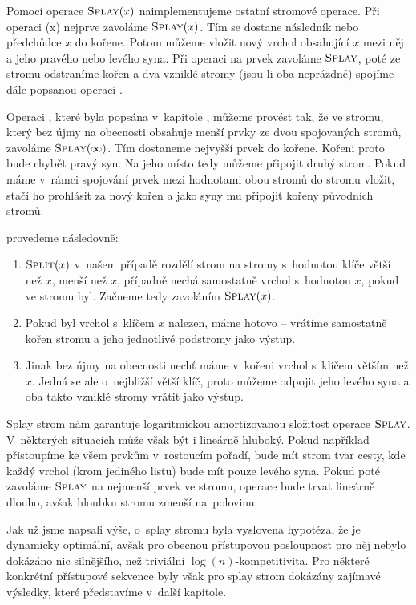 Pomocí operace $\ope{Splay}(x)$ naimplementujeme ostatní stromové operace. Při
operaci (x) nejprve zavoláme $\ope{Splay}(x)$. Tím se dostane
následník nebo předchůdce $x$ do kořene. Potom můžeme vložit nový vrchol
obsahující $x$ mezi něj a jeho pravého nebo levého syna. Při operaci  na
prvek zavoláme $\ope{Splay}$, poté ze stromu odstraníme kořen a dva vzniklé
stromy (jsou-li oba neprázdné)  spojíme dále popsanou operací .

Operaci , které byla popsána v~kapitole , můžeme
provést tak, že ve stromu, který bez újmy na obecnosti obsahuje menší prvky ze
dvou spojovaných stromů, zavoláme $\ope{Splay}(\infty)$. Tím dostaneme nejvyšší
prvek do kořene. Kořeni proto bude chybět pravý syn. Na jeho místo tedy můžeme
připojit druhý strom. Pokud máme v~rámci spojování prvek mezi hodnotami obou
stromů do stromu vložit, stačí ho prohlásit za nový kořen a jako syny mu
připojit kořeny původních stromů. 


 provedeme následovně:

\begin{enumerate}
\item $\ope{Split}(x)$ v~našem případě rozdělí strom na stromy s~hodnotou klíče větší než $x$, menší než $x$, případně nechá samostatně vrchol s~hodnotou $x$, pokud ve stromu byl. Začneme tedy zavoláním $\ope{Splay}(x)$.
\item Pokud byl vrchol s~klíčem $x$ nalezen, máme hotovo -- vrátíme samostatně kořen stromu a jeho jednotlivé podstromy jako výstup.
\item Jinak bez újmy na obecnosti nechť máme v~kořeni vrchol s~klíčem větším než $x$. Jedná se ale o~nejbližší větší klíč, proto můžeme odpojit jeho levého syna a oba takto vzniklé stromy vrátit jako výstup.
\end{enumerate}

Splay strom nám garantuje logaritmickou amortizovanou složitost operace
$\ope{Splay}$. V~některých situacích může však být i lineárně hluboký. Pokud
například přistoupíme ke všem prvkům v~rostoucím pořadí, bude mít strom tvar
cesty, kde každý vrchol (krom jediného listu) bude mít pouze levého syna. Pokud
poté zavoláme $\ope{Splay}$ na nejmenší prvek ve stromu, operace bude trvat lineárně
dlouho, avšak hloubku stromu zmenší na~polovinu.

Jak už jsme napsali výše, o~splay stromu byla vyslovena hypotéza, že je
dynamicky optimální, avšak pro obecnou přístupovou posloupnost pro něj nebylo
dokázáno nic silnějšího, než triviální $\log(n)$-kompetitivita. Pro některé
konkrétní přístupové sekvence byly však pro splay strom dokázány zajímavé
výsledky, které                  představíme v~další kapitole.

